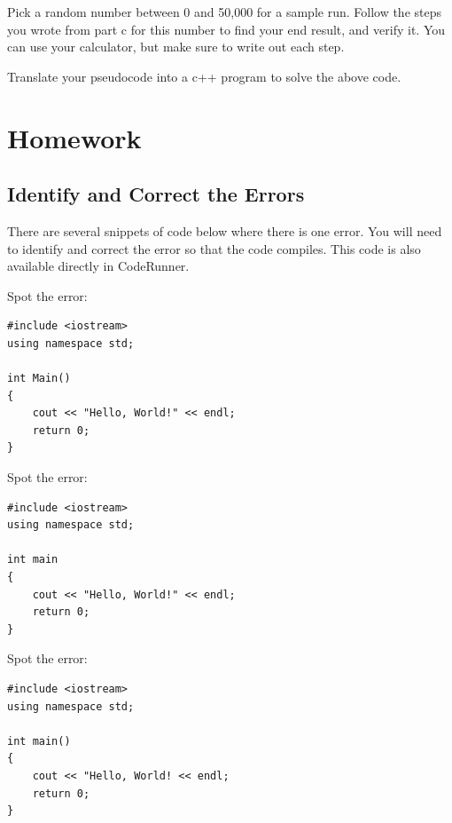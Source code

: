\begin{multipart}
    Pick a random number between 0 and 50,000 for a sample run. Follow the steps you wrote from part c for this number to find your end result, and verify it. You can use your calculator, but make sure to write out each step.
\end{multipart}

\vspace{7cm}

\begin{multipart}
    Translate your pseudocode into a c++ program to solve the above code. 
\end{multipart}

\section{Homework}
\subsection{Identify and Correct the Errors}
There are several snippets of code below where there is one error. You will need to identify and correct the error so that the code compiles. This code is also available directly in CodeRunner. 

\begin{multipart}
Spot the error:

    \begin{verbatim}
#include <iostream> 
using namespace std;

int Main()
{
    cout << "Hello, World!" << endl;
    return 0; 
}
    \end{verbatim}
\end{multipart}

\begin{multipart}
Spot the error:

    \begin{verbatim}
#include <iostream> 
using namespace std;

int main 
{
    cout << "Hello, World!" << endl;
    return 0; 
}
    \end{verbatim}
\end{multipart}

\begin{multipart}
Spot the error:

    \begin{verbatim}
#include <iostream> 
using namespace std;

int main() 
{
    cout << "Hello, World! << endl;
    return 0; 
} 
    \end{verbatim}
\end{multipart}

